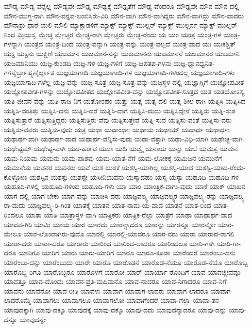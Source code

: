 {ಮೌಡ್ಯ
ಮೌಡ್ಯ-ವನ್ನೆಲ್ಲ
ಮೌಡ್ಯವೇ
ಮೌಢ್ಯ
ಮೌಢ್ಯಕ್ಕೆ
ಮೌಢ್ಯತೆಗೆ
ಮೌಢ್ಯ-ವೆಂದರೂ
ಮೌಢ್ಯವೇ
ಮೌನ
ಮೌನ-ದಲ್ಲಿ
ಮೌನ-ಮುಗ್ಧ-ರಾಗಿ
ಮೌನ-ವನ್ನವ-ಲಂಬಿಸಿರು-ವಿರಿ
ಮೌನ-ವಾಗಿ
ಮೌನ-ವಾಗಿದ್ದರು
ಮೌನ-ವಾಗಿದ್ದು
ಮೌನ-ವಾದರು
ಮೌನಾಶ್ರು-ಧಾರೆ-ಯಲಿ
ಮೌಲಿ
ಮ್ಯಾಕ್ಲಾಡಳಿಗೆ
ಮ್ಯಾಕ್ಸ್
ಮ್ಯಾಕ್ಸ್-ಮುಲ್ಲರ್
ಮ್ಯಾಕ್ಸ್-ಮುಲ್ಲರ್ನ
ಮ್ಯಾಕ್ಸ್-ಮುಲ್ಲರ್-ನಿಂದ
ಮ್ರಿಯಸ್ವ
ಮ್ಲೇಚ್ಛ
ಮ್ಲೇಚ್ಛರ
ಮ್ಲೇಚ್ಛ-ರಾಗಿ
ಮ್ಲೇಚ್ಛರು
ಮ್ಲೇಚ್ಛ-ರೆಂದು
ಯ
ಯಂ
ಯಂತ್ರ
ಯಂತ್ರ-ಗಳ
ಯಂತ್ರ-ಗಳನ್ನಾಗಿ
ಯಂತ್ರದ
ಯಂತ್ರ-ದಿಂದ
ಯಂತ್ರ-ವನ್ನಾಗಿ
ಯಂತ್ರ-ವನ್ನು
ಯಂತ್ರ-ವಲ್ಲದೆ
ಯಂತ್ರ-ವಾದ
ಯಃ
ಯಃಕಶ್ಚಿತ್
ಯಕ್ಷ
ಯಕ್ಷನು
ಯಕ್ಷಿಣಿ
ಯಜಮಾನ
ಯಜಮಾನ-ನನ್ನು
ಯಜಮಾನನು
ಯಜಮಾನನೆ
ಯಜಮಾನರ
ಯಜಮಾನಿ
ಯಜಮಾನಿಯು
ಯಜ್ಞ-ಕುಂಡದಿ
ಯಜ್ಞ-ಗಳ
ಯಜ್ಞ-ಗಳಿಗೆ
ಯಜ್ಞ-ಜಪತಪ-ಗಳನು
ಯಜ್ಞ-ಧ್ವಾನಧ್ವನಿತ-ಗಗನೈರ್ಬ್ರಾಹ್ಮಣೈರ್ಜ್ಞಾತ
ಯಜ್ಞಯಾಗಾದಿ
ಯಜ್ಞಯಾಗಾದಿ-ಗಳ
ಯಜ್ಞಯಾಗಾದಿ-ಗಳಿಂದಲ್ಲ
ಯಜ್ಞಯಾಗಾದಿ-ಗಳು
ಯಜ್ಞಯಾಗಾದಿ-ಗಳೆಲ್ಲ
ಯಜ್ಞ-ವನ್ನು
ಯಜ್ಞ-ಸೂತ್ರ
ಯಜ್ಞ-ಸೂತ್ರ-ವನ್ನು
ಯಜ್ಞಸ್ಥಳ-ದಲ್ಲಿ
ಯಜ್ಞಾಗ್ನಿಗೆ
ಯಜ್ಞೋಪವೀತ
ಯಜ್ಞೋಪವೀತ-ಗಳನ್ನು
ಯಜ್ಞೋಪವೀತದ
ಯಜ್ಞೋಪವೀತ-ವನ್ನು
ಯಜ್ಞೋಪವೀತ-ಸೂತ್ರದ
ಯತ
ಯತಯೋಽಸ್ಯ
ಯತಿ-ಜೀವನ-ವನ್ನು
ಯತಿ-ರಾಜ-ನಿಗೆ
ಯತೋಽಹಂ
ಯತ್ತು
ಯತ್ನ
ಯತ್ನ-ದಲಿ
ಯತ್ನ-ಶೀಲ-ರಾಗಿ
ಯತ್ನಿಸಿ
ಯತ್ನಿಸಿದ
ಯತ್ನಿಸಿ-ದಂತಿತ್ತು
ಯತ್ನಿಸಿ-ದನು
ಯತ್ನಿಸಿ-ದರೆ
ಯತ್ನಿಸಿ-ದಾಗ
ಯತ್ನಿಸಿ-ದುದು
ಯತ್ನಿಸಿದ್ದೇನೆ
ಯತ್ನಿಸು
ಯತ್ನಿ-ಸುತ
ಯತ್ನಿಸುತ್ತಾರೆ
ಯತ್ನಿಸುತ್ತಿದ್ದರು
ಯತ್ನಿಸುತ್ತಿರು-ವೆವು
ಯತ್ನಿಸುತ್ತೇವೆ
ಯತ್ನಿ-ಸುವ
ಯತ್ನಿಸು-ವಂತೆ
ಯತ್ನಿಸು-ವರು
ಯತ್ನಿಸು-ವವರು
ಯತ್ನಿಸು-ವುದು
ಯತ್ರ
ಯಥಾ
ಯಥಾಂಧಾಃ
ಯಥಾಯ
ಯಥಾಯ್
ಯಥಾರ್ಥ
ಯಥಾರ್ಥಃ
ಯಥಾರ್ಥ-ವಾಗಿ
ಯಥಾರ್ಥ-ವಾದ
ಯಥಾರ್ಥ-ವೆನ್ನಿಸು-ವುದು
ಯಥಾ-ವತ್ತಾಗಿ
ಯಥಾ-ವಿಧಿ-ಯಾಗಿ
ಯಥೇಚ್ಛ-ವಾಗಿ
ಯಥೇಷ್ಟಮ್
ಯಥೇಷ್ಟ-ವಾಗಿ
ಯದ-ಹರೇವ
ಯದಾ
ಯದಿ
ಯದ್ವೈ
ಯನಾಯ
ಯನ್ನು
ಯಬೆ
ಯಮತ್ವ
ಯಮನ
ಯಮ-ನಿಯಮ
ಯಮನು
ಯಮ-ಪಾಶವು
ಯಮ-ಯಾತ-ನೆಗೆ
ಯಮ-ಲೋಕಕ್ಕೆ
ಯಮಿಜನ
ಯಮುನೆಗೆ
ಯಮುನೆಯ
ಯವನರ
ಯವನರು
ಯವೆ
ಯಶ
ಯಶಕೆ
ಯಶಸ್ವಿ-ಯಾಗಿಲ್ಲ
ಯಶಸ್ವಿ-ಯಾದ
ಯಶಸ್ವಿ-ಯಾದ-ರೆಂದು-ಕೊಳ್ಳೋಣ
ಯಶಸ್ಸಿನ
ಯಶಸ್ಸು
ಯಶಸ್ಸೇ
ಯಸೀನಿಯವನು
ಯಸ್ಮಾದಹಂ
ಯಸ್ಯ
ಯಸ್ಯಾ
ಯಹೂದಿ
ಯಹೂದಿ-ಗಳ
ಯಹೂದಿ-ಗಳಲ್ಲಿ
ಯಹೂದಿ-ಗಳಿಂದ
ಯಹೂದಿ-ಗಳು
ಯಾ
ಯಾಂ
ಯಾಂತ್ರಿಕ-ವಾಗು-ವುದು
ಯಾಕೆ
ಯಾಕ್
ಯಾಖನ
ಯಾಗ-ದಲ್ಲಿ
ಯಾಗ-ಬೇಕು
ಯಾಗ-ವನ್ನು
ಯಾಚಿಸಿ-ದರು
ಯಾಜ್ಞವಲ್ಕ್ಯ
ಯಾಜ್ಞವಲ್ಕ್ಯರ
ಯಾಜ್ಞವಲ್ಕ್ಯ-ರನ್ನು
ಯಾಜ್ಞವಲ್ಕ್ಯ-ರಾ-ದುದು
ಯಾಜ್ಞವಲ್ಕ್ಯ-ರಿ-ಗಿಂತ
ಯಾತಕ್ಕೆ
ಯಾತನ
ಯಾತ-ನಾಮ-ಯ-ವಾದ
ಯಾತನೆ
ಯಾತ-ರಿಂದ
ಯಾತ-ರಿಂದಲೂ
ಯಾತಾ
ಯಾತಿ
ಯಾತ್ರಾಸ್ಥಳ-ವಾಗಿ
ಯಾತ್ರಿಕರು
ಯಾತ್ರಿಕ-ರೆಲ್ಲಾ
ಯಾತ್ರೆಗೆ
ಯಾಥಾ
ಯಾಥಾರ್ಥ-ವಾದ
ಯಾದವ-ಗಿರಿ
ಯಾಮಿ
ಯಾಯ
ಯಾರ
ಯಾರದು
ಯಾರನ್ನಾದರೂ
ಯಾರನ್ನು
ಯಾರನ್ನೂ
ಯಾರನ್ನೋ
ಯಾರ-ಮೇಲೂ
ಯಾರ-ಲೊಂದಾಗಿರು-ವುದೊ
ಯಾರಲ್ಲಿ
ಯಾರಲ್ಲಿ-ಯಾದರೂ
ಯಾರ-ವರು
ಯಾರಾ
ಯಾರಾದ-ರಾಗಲಿ
ಯಾರಾ-ದರು
ಯಾರಾ-ದರೂ
ಯಾರಾರು
ಯಾರಿಂದ
ಯಾರಿಂದ-ಲಾದರೂ
ಯಾರಿಂದಲೂ
ಯಾರಿ-ಗಾಗಿ
ಯಾರಿ-ಗಾ-ದರೂ
ಯಾರಿಗೂ
ಯಾರಿಗೆ
ಯಾರು
ಯಾರು-ಯಾರಿಗೆ
ಯಾರೂ
ಯಾರೂ-ಕೂಡಾ
ಯಾರೆಂದರೆ
ಯಾರೆಂಬು-ದನು
ಯಾರೆಂಬು-ದನ್ನು
ಯಾರೆಂಬುದು
ಯಾರೇ
ಯಾರೊ
ಯಾರೊಡನೆ
ಯಾರೊಡ-ನೆಯೂ
ಯಾರೊಡ-ನೆಯೊ
ಯಾರೊಬ್ಬ
ಯಾರೊಬ್ಬ-ರಿಗೂ
ಯಾರೊಬ್ಬರೂ
ಯಾರೊಳಗೆ
ಯಾರೋ
ಯಾರ್
ಯಾರ್ಯಾ-ರೊಂದಿಗೆ
ಯಾವ
ಯಾವಜ್ಜೀವವೂ
ಯಾವತ್ತೂ
ಯಾವ-ದೊಂದು
ಯಾವನ-ಪ್ರತಿ-ಮಹಿಮನೊ
ಯಾವ-ನಾದರೂ
ಯಾವ-ನಿಗಾದರೂ
ಯಾವ-ನಿಗೆ
ಯಾವನು
ಯಾವನೋ
ಯಾವ-ರೀತಿ
ಯಾವಳು
ಯಾವಾಗ
ಯಾವಾಗ-ಲಾದರು
ಯಾವಾಗ-ಲಾದರೂ
ಯಾವಾಗ-ಲಾದರೊಮ್ಮೆ
ಯಾವಾಗಲು
ಯಾವಾಗಲೂ
ಯಾವಾಗಲೋ
ಯಾವಾಗೆಂದರೆ
ಯಾವಾ-ಗೆಲ್ಲಾ
ಯಾವಾ-ತನ
ಯಾವುದಕ್ಕಾಗಿ
ಯಾವು-ದಕ್ಕೂ
ಯಾವುದಕ್ಕೆ
ಯಾವು-ದಕ್ಕೊ
ಯಾವು-ದದು
ಯಾವುದನ್ನಾದರೂ
ಯಾವು-ದನ್ನು
ಯಾವು-ದನ್ನೂ
ಯಾವುದನ್ನೇ
}
